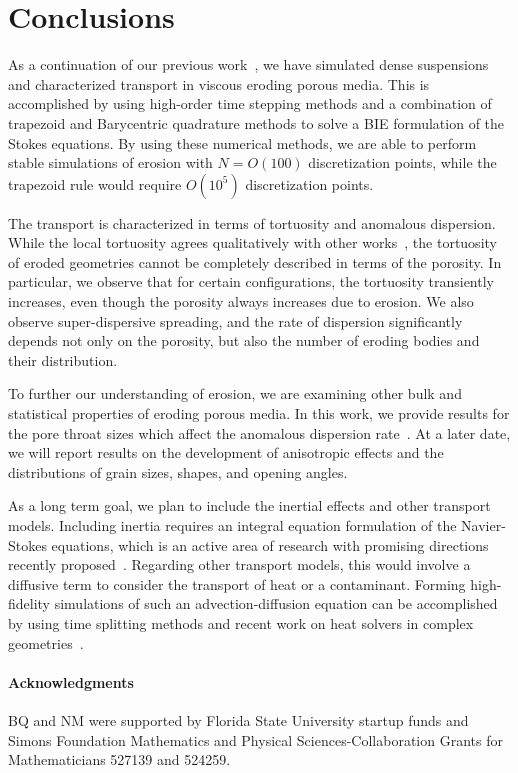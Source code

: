 \documentclass{jfm}
\begin{document}
\section{Conclusions}
\label{sec:conclusions}
As a continuation of our previous work~\citep{qua-moo2018}, we have
simulated dense suspensions and characterized transport in viscous
eroding porous media. This is accomplished by using high-order time
stepping methods and a combination of trapezoid and Barycentric
quadrature methods to solve a BIE formulation of the Stokes equations.
By using these numerical methods, we are able to perform stable
simulations of erosion with $N = O(100)$ discretization points, while
the trapezoid rule would require $O(10^5)$ discretization points.

The transport is characterized in terms of tortuosity and anomalous
dispersion. While the local tortuosity agrees qualitatively with other
works~\citep{mat-kha-koz2008}, the tortuosity of eroded geometries
cannot be completely described in terms of the porosity. In particular,
we observe that for certain configurations, the tortuosity transiently
increases, even though the porosity always increases due to erosion. We
also observe super-dispersive spreading, and the rate of dispersion
significantly depends not only on the porosity, but also the number of
eroding bodies and their distribution.

To further our understanding of erosion, we are examining other bulk and
statistical properties of eroding porous media. In this work, we provide
results for the pore throat sizes which affect the anomalous dispersion
rate~\citep{dea-qua-bir-jua2018}.  At a later date, we will report
results on the  development of anisotropic effects and the distributions
of grain sizes, shapes, and opening angles.

As a long term goal, we plan to include the inertial effects and other
transport models. Including inertia requires an integral equation
formulation of the Navier-Stokes equations, which is an active area of
research with promising directions recently
proposed~\citep{gray2019boundary, kli-ask-kro2019}.  Regarding other
transport models, this would involve a diffusive term to consider the
transport of heat or a contaminant. Forming high-fidelity simulations of
such an advection-diffusion equation can be accomplished by using time
splitting methods and recent work on heat solvers in complex
geometries~\citep{fry-kro-tor2019}.


\paragraph{\bf Acknowledgments} BQ and NM were supported by Florida
State University startup funds and Simons Foundation Mathematics and
Physical Sciences-Collaboration Grants for Mathematicians 527139 and
524259.

 

\end{document}

